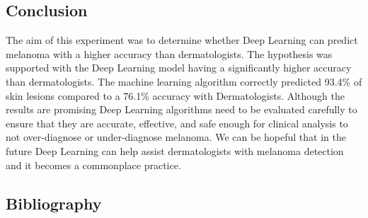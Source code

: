 \documentclass{article}
\begin{document}
\subsection{Conclusion}
The aim of this experiment was to determine whether Deep Learning can predict melanoma with a higher accuracy than dermatologists. The hypothesis was supported with the Deep Learning model having a significantly higher accuracy than dermatologists. The machine learning algorithm correctly predicted 93.4\% of skin lesions compared to a 76.1\% accuracy with Dermatologists. Although the results are promising Deep Learning algorithms need to be evaluated carefully to ensure that they are accurate, effective, and safe enough for clinical analysis to not over-diagnose or under-diagnose melanoma. We can be hopeful that in the future Deep Learning can help assist dermatologists with melanoma detection and it becomes a commonplace practice.

\newpage

\subsection{Bibliography}
\end{document}
